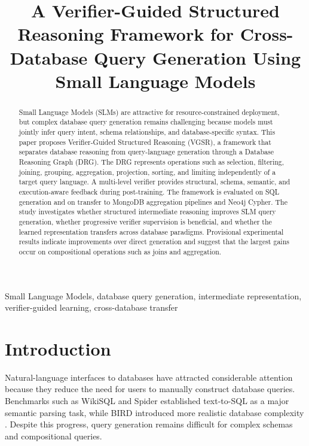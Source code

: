 \documentclass[conference]{IEEEtran}
\begin{document}
\title{A Verifier-Guided Structured Reasoning Framework for Cross-Database Query Generation Using Small Language Models}

\author{
}

\maketitle

\begin{abstract}
Small Language Models (SLMs) are attractive for resource-constrained deployment, but complex database query generation remains challenging because models must jointly infer query intent, schema relationships, and database-specific syntax. This paper proposes Verifier-Guided Structured Reasoning (VGSR), a framework that separates database reasoning from query-language generation through a Database Reasoning Graph (DRG). The DRG represents operations such as selection, filtering, joining, grouping, aggregation, projection, sorting, and limiting independently of a target query language. A multi-level verifier provides structural, schema, semantic, and execution-aware feedback during post-training. The framework is evaluated on SQL generation and on transfer to MongoDB aggregation pipelines and Neo4j Cypher. The study investigates whether structured intermediate reasoning improves SLM query generation, whether progressive verifier supervision is beneficial, and whether the learned representation transfers across database paradigms. Provisional experimental results indicate improvements over direct generation and suggest that the largest gains occur on compositional operations such as joins and aggregation.
\end{abstract}

\begin{IEEEkeywords}
Small Language Models, database query generation, intermediate representation, verifier-guided learning, cross-database transfer
\end{IEEEkeywords}

\section{Introduction}
Natural-language interfaces to databases have attracted considerable attention because they reduce the need for users to manually construct database queries. Benchmarks such as WikiSQL and Spider established text-to-SQL as a major semantic parsing task, while BIRD introduced more realistic database complexity \cite{b1,b2,b3}. Despite this progress, query generation remains difficult for complex schemas and compositional queries.
\end{document}
